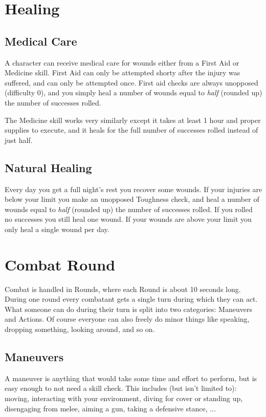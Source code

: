 \section{Healing}

\subsection{Medical Care}
A character can receive medical care for wounds either from a First Aid or Medicine skill.
First Aid can only be attempted shorty after the injury was suffered, and can only be attempted once.
First aid checks are always unopposed (difficulty 0), 
and you simply heal a number of wounds equal to \textit{half} (rounded up) the number of successes rolled.

The Medicine skill works very similarly except it takes at least 1 hour and proper supplies to execute,
and it heals for the full number of successes rolled instead of just half.

\subsection{Natural Healing}
Every day you get a full night's rest you recover some wounds. 
If your injuries are below your limit you make an unopposed Toughness check,
and heal a number of wounds equal to \textit{half} (rounded up) the number of successes rolled. 
If you rolled no successes you still heal one wound.
If your wounds are above your limit you only heal a single wound per day.

\section{Combat Round}
Combat is handled in Rounds, where each Round is about 10 seconds long.
During one round every combatant gets a single turn during which they can act.
What someone can do during their turn is split into two categories: Maneuvers and Actions.
Of course everyone can also freely do minor things like speaking, dropping something, looking around, and so on. 

\subsection{Maneuvers}
A maneuver is anything that would take some time and effort to perform, but is easy enough to not need a skill check.
This includes (but isn't limited to): moving, interacting with your environment, 
diving for cover or standing up, disengaging from melee, aiming a gun, taking a defensive stance, ...

